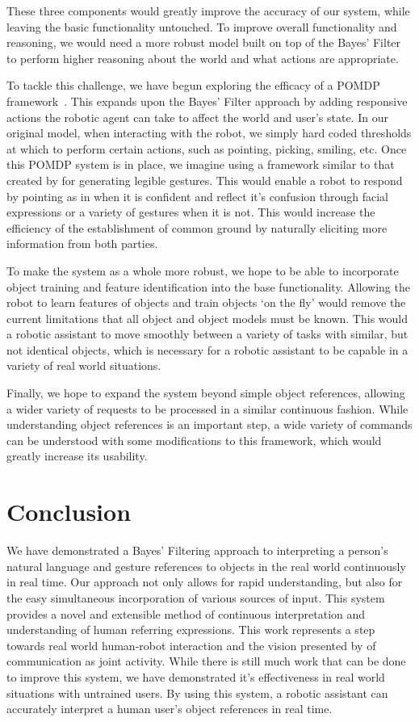 \documentclass[a4paper, 11pt]{article} %
\begin{document}
These three components would greatly improve the accuracy of our system, while leaving the basic functionality untouched. To improve overall functionality and reasoning, we would need a more robust model built on top of the Bayes' Filter to perform higher reasoning about the world and what actions are appropriate.

To tackle this challenge, we have begun exploring the efficacy of a POMDP framework~\citep{kaelbling99}. This expands upon the Bayes' Filter approach by adding responsive actions the robotic agent can take to affect the world and user's state. In our original model, when interacting with the robot, we simply hard coded thresholds at which to perform certain actions, such as pointing, picking, smiling, etc. Once this POMDP system is in place, we imagine using a framework similar to that created by \citet{dragan13} for generating legible gestures. This would enable a robot to respond by pointing as in \citet{holladay14} when it is confident and reflect it's confusion through facial expressions or a variety of gestures when it is not. This would increase the efficiency of the establishment of common ground by naturally eliciting more information from both parties.

To make the system as a whole more robust, we hope to be able to incorporate object training and feature identification into the base functionality. Allowing the robot to learn features of objects and train objects `on the fly' would remove the current limitations that all object and object models must be known. This would a robotic assistant to move smoothly between a variety of tasks with similar, but not identical objects, which is necessary for a robotic assistant to be capable in a variety of real world situations.

Finally, we hope to expand the system beyond simple object references, allowing a wider variety of requests to be processed in a similar continuous fashion. While understanding object references is an important step, a wide variety of commands can be understood with some modifications to this framework, which would greatly increase its usability.
\section{Conclusion}
We have demonstrated a Bayes' Filtering approach to interpreting a person's natural language and gesture references to objects in the real world continuously in real time. Our approach not only allows for rapid understanding, but also for the easy simultaneous incorporation of various sources of input. This system provides a novel and extensible method of continuous interpretation and understanding of human referring expressions. This work represents a step towards real world human-robot interaction and the vision presented by \citet{clark96} of communication as joint activity. While there is still much work that can be done to improve this system, we have demonstrated it's effectiveness in real world situations with untrained users. By using this system, a robotic assistant can accurately interpret a human user's object references in real time.
\newpage


\end{document}
